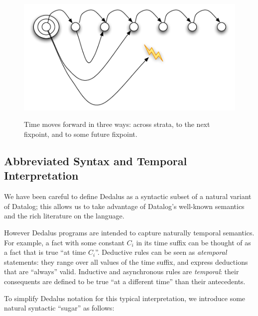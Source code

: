 \begin{figure}[t]
  \centering
  \includegraphics[width=0.75\linewidth]{dedalus-time.pdf}
  \label{fig:dedalus-time}
  \caption{Time moves forward in three ways: across strata, to the next fixpoint, and to some future fixpoint.}
\vspace{-8pt}
\end{figure}




\subsection{Abbreviated Syntax and Temporal Interpretation}
We have been careful to define Dedalus as a syntactic subset of a natural variant of Datalog; this allows us to take advantage of Datalog's well-known semantics and the rich literature on the language.  

However Dedalus programs are intended to capture naturally temporal semantics.  For example, a fact with some constant $C_i$ in its time suffix can be thought of as a fact that is true ``at time $C_i$''.  Deductive rules can be seen as {\em atemporal} statements: they range over all values of the time suffix, and express deductions that are ``always'' valid.
Inductive and asynchronous rules are {\em temporal}:
their consequents are defined to be true ``at a different time'' than their antecedents. 

To simplify Dedalus notation for this typical interpretation,  we introduce some natural syntactic ``sugar'' as follows:  

